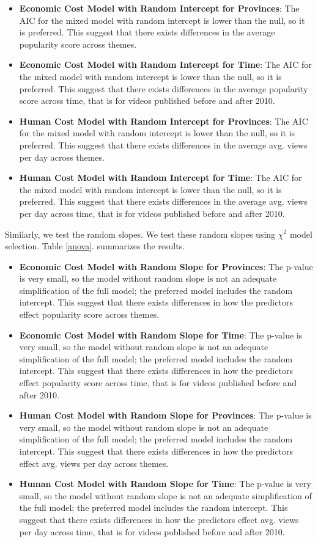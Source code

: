 \begin{itemize}
	\item \textbf{Economic Cost Model with Random Intercept for Provinces}: The AIC for the mixed model with random intercept is lower than the null, so it is preferred. This suggest that there exists differences in the average popularity score across themes.
	\item \textbf{Economic Cost Model with Random Intercept for Time}: The AIC for the mixed model with random intercept is lower than the null, so it is preferred. This suggest that there exists differences in the average popularity score across time, that is for videos published before and after 2010.
	\item \textbf{Human Cost Model with Random Intercept for Provinces}: The AIC for the mixed model with random intercept is lower than the null, so it is preferred. This suggest that there exists differences in the average avg. views per day across themes.
	\item \textbf{Human Cost Model with Random Intercept for Time}: The AIC for the mixed model with random intercept is lower than the null, so it is preferred. This suggest that there exists differences in the average avg. views per day across time, that is for videos published before and after 2010.
\end{itemize}

Similarly, we test the random slopes. We test these random slopes using $\chi^2$ model selection. Table \ref{anova}. summarizes the results.
\begin{itemize}
	\item \textbf{Economic Cost Model with Random Slope for Provinces}: The p-value is very small, so the model without random slope is not an adequate simplification of the full model; the preferred model includes the random intercept. 
	This suggest that there exists differences in how the predictors effect popularity score across themes.
	\item \textbf{Economic Cost Model with Random Slope for Time}: The p-value is very small, so the model without random slope is not an adequate simplification of the full model; the preferred model includes the random intercept. This suggest that there exists differences in how the predictors effect popularity score across time, that is for videos published before and after 2010.
	\item \textbf{Human Cost Model with Random Slope for Provinces}: The p-value is very small, so the model without random slope is not an adequate simplification of the full model; the preferred model includes the random intercept. This suggest that there exists differences in how the predictors effect avg. views per day across themes.
	\item \textbf{Human Cost Model with Random Slope for Time}: The p-value is very small, so the model without random slope is not an adequate simplification of the full model; the preferred model includes the random intercept. This suggest that there exists differences in how the predictors effect avg. views per day across time, that is for videos published before and after 2010.
\end{itemize}
